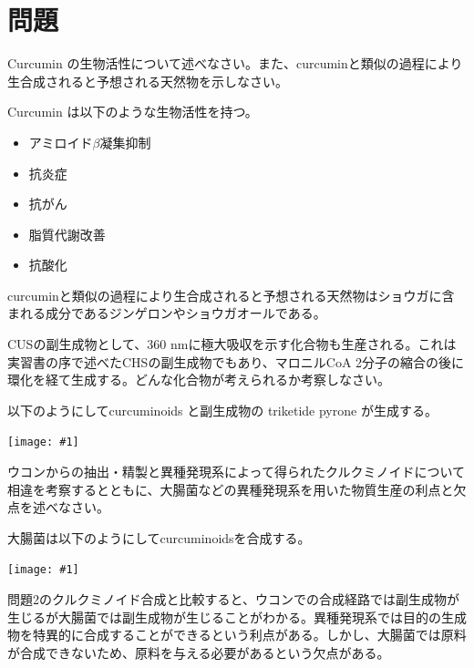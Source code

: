 \documentclass[a4paper,papersize,dvipdfmx]{jsarticle}
\newcommand{\pic}[1]{\begin{center} \texttt{[image: \#1]} \end{center}}   %
\newcommand{\pict}[2]{\begin{center} \texttt{[image: \#1]} \end{center}}   %
\begin{document}
\section*{問題}
\begin{tcolorbox}[colback=white,colbacktitle=black,coltitle=white,title={問題1}]
Curcumin の生物活性について述べなさい。また、curcuminと類似の過程により生合成されると予想される天然物を示しなさい。
\end{tcolorbox}

Curcumin は以下のような生物活性を持つ。
\begin{itemize}
\item アミロイド$\beta$凝集抑制
\item 抗炎症
\item 抗がん
\item 脂質代謝改善
\item 抗酸化
\end{itemize}

curcuminと類似の過程により生合成されると予想される天然物はショウガに含まれる成分であるジンゲロンやショウガオールである。

\begin{tcolorbox}[colback=white,colbacktitle=black,coltitle=white,title={問題2}]
CUSの副生成物として、360 nmに極大吸収を示す化合物も生産される。これは実習書の序で述べたCHSの副生成物でもあり、マロニルCoA 2分子の縮合の後に環化を経て生成する。どんな化合物が考えられるか考察しなさい。
\end{tcolorbox}

以下のようにしてcurcuminoids と副生成物の triketide pyrone が生成する。

\pic{imgs/kd22.jpg}

\begin{tcolorbox}[colback=white,colbacktitle=black,coltitle=white,title={問題3}]
ウコンからの抽出・精製と異種発現系によって得られたクルクミノイドについて相違を考察するとともに、大腸菌などの異種発現系を用いた物質生産の利点と欠点を述べなさい。
\end{tcolorbox}

大腸菌は以下のようにしてcurcuminoidsを合成する。
\pict{imgs/kd23.jpeg}{15}

問題2のクルクミノイド合成と比較すると、ウコンでの合成経路では副生成物が生じるが大腸菌では副生成物が生じることがわかる。異種発現系では目的の生成物を特異的に合成することができるという利点がある。しかし、大腸菌では原料が合成できないため、原料を与える必要があるという欠点がある。
\end{document}
